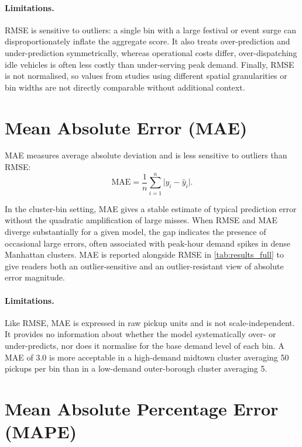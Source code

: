 \paragraph{Limitations.} RMSE is sensitive to outliers: a single bin with a large festival or event surge can disproportionately inflate the aggregate score. It also treats over-prediction and under-prediction symmetrically, whereas operational costs differ, over-dispatching idle vehicles is often less costly than under-serving peak demand. Finally, RMSE is not normalised, so values from studies using different spatial granularities or bin widths are not directly comparable without additional context.

\section{Mean Absolute Error (MAE)}

MAE measures average absolute deviation and is less sensitive to outliers than RMSE:
\begin{equation}
 \text{MAE} = \frac{1}{n}\sum_{i=1}^n \bigl|y_i - \hat{y}_i\bigr|.
 \label{eq:mae}
\end{equation}

In the cluster-bin setting, MAE gives a stable estimate of typical prediction error without the quadratic amplification of large misses. When RMSE and MAE diverge substantially for a given model, the gap indicates the presence of occasional large errors, often associated with peak-hour demand spikes in dense Manhattan clusters. MAE is reported alongside RMSE in \autoref{tab:results_full} to give readers both an outlier-sensitive and an outlier-resistant view of absolute error magnitude.

\paragraph{Limitations.} Like RMSE, MAE is expressed in raw pickup units and is not scale-independent. It provides no information about whether the model systematically over- or under-predicts, nor does it normalise for the base demand level of each bin. A MAE of 3.0 is more acceptable in a high-demand midtown cluster averaging 50 pickups per bin than in a low-demand outer-borough cluster averaging 5.

\section{Mean Absolute Percentage Error (MAPE)}

